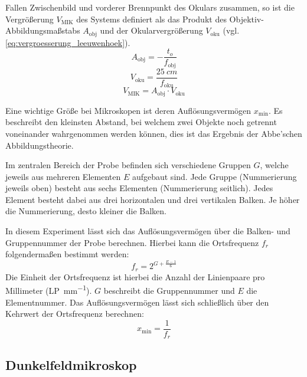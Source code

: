 \documentclass[english, ngerman]{scrartcl}
\begin{document}
Fallen Zwischenbild und vorderer Brennpunkt des Okulars zusammen, so ist die Vergrößerung $V_{\text{MIK}}$ des Systems definiert als das Produkt des Objektiv-Abbildungsmaßstabs $A_{\text{obj}}$ und der Okularvergrößerung $V_{\text{oku}}$ (vgl. \autoref{eq:vergroesserung_leeuwenhoek}).
%
\begin{equation}
    \label{eq:objektivabbildungsmaszstab}
    A_{\text{obj}} = -\frac{t_o}{f_{\text{obj}}}
\end{equation}
\begin{equation}
    \label{eq:okularvergroeszerung}
    V_{\text{oku}} = \frac{\SI{25}{cm}}{f_{\text{oku}}}
\end{equation}
\begin{equation}
    \label{eq:gesamtvergroesserung}
    V_{\text{MIK}} = A_{\text{obj}} \cdot V_{\text{oku}}
\end{equation}

Eine wichtige Größe bei Mikroskopen ist deren Auflösungsvermögen $x_\text{min}$. Es beschreibt den kleinsten Abstand, bei welchem zwei Objekte noch getrennt voneinander wahrgenommen werden können, dies ist das Ergebnis der Abbe'schen Abbildungstheorie.

Im zentralen Bereich der Probe befinden sich verschiedene Gruppen $G$, welche jeweils aus mehreren Elementen $E$ aufgebaut sind. Jede Gruppe (Nummerierung jeweils oben) besteht aus sechs Elementen (Nummerierung seitlich). Jedes Element besteht dabei aus drei horizontalen und drei vertikalen Balken. Je höher die Nummerierung, desto kleiner die Balken.

In diesem Experiment lässt sich das Auflösungsvermögen über die Balken- und Gruppennummer der Probe berechnen. Hierbei kann die Ortsfrequenz $f_r$ folgendermaßen bestimmt werden:
%
\begin{equation}
    \label{eq:ortsfrequenz}
    f_r = 2^{G+\frac{E-1}{6}}
\end{equation}
%
Die Einheit der Ortsfrequenz ist hierbei die Anzahl der Linienpaare pro Millimeter (\si{LP\per\milli\meter}). $G$ beschreibt die Gruppennummer und $E$ die Elementnummer. Das Auflösungsvermögen lässt sich schließlich über den Kehrwert der Ortsfrequenz berechnen:
%
\begin{equation}
    \label{eq:aufloesungsvermoegen}
    x_\text{min} = \frac{1}{f_r}
\end{equation}


\subsection{Dunkelfeldmikroskop}
\label{subsec:dunkelfeldmikroskop_grundlagen}
\end{document}
